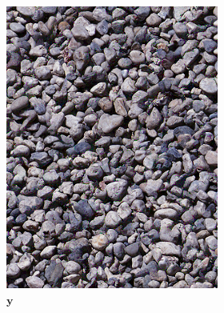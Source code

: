 \begin{figure}[]
    \centering    
    \begin{subfigure}{\textwidth}
        \centering
        \begin{subfigure}{0.24\textwidth}
            \centering
            \includegraphics[width=\textwidth]{images/04-experiment02/human/pebbles/target.jpg}
            \caption*{\(\bm{y}\)}
        \end{subfigure}
        \hfill
        \begin{subfigure}{0.24\textwidth}
            \centering

\end{subfigure}
\end{subfigure}
\end{figure}
